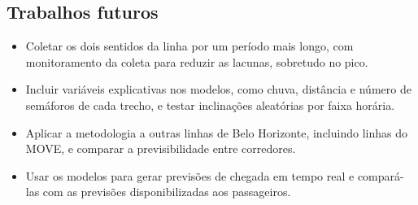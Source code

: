 \subsection{Trabalhos futuros}

\begin{itemize}
  \item Coletar os dois sentidos da linha por um período mais longo, com monitoramento da
        coleta para reduzir as lacunas, sobretudo no pico.
  \item Incluir variáveis explicativas nos modelos, como chuva, distância e número de
        semáforos de cada trecho, e testar inclinações aleatórias por faixa horária.
  \item Aplicar a metodologia a outras linhas de Belo Horizonte, incluindo linhas do MOVE, e
        comparar a previsibilidade entre corredores.
  \item Usar os modelos para gerar previsões de chegada em tempo real e compará-las com as
        previsões disponibilizadas aos passageiros.
\end{itemize}
